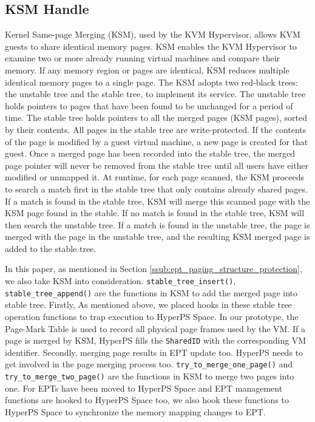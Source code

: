 \subsection{KSM Handle}%
\label{sub:ksm_handle}
Kernel Same-page Merging (KSM), used by the KVM Hypervisor, allows KVM guests to share identical memory pages. 
KSM enables the KVM Hypervisor to examine two or more already running virtual machines and compare their memory. If any memory region or pages are identical, KSM reduces multiple identical memory pages to a single page. 
The KSM adopts two red-black trees: the unstable tree and the stable tree, to implement its service.
The unstable tree holds pointers to pages that have been found to be unchanged for a period of time. 
The stable tree holds pointers to all the merged pages (KSM pages), sorted by their contents. All pages in the stable tree are write-protected. 
If the contents of the page is modified by a guest virtual machine, a new page is created for that guest.
Once a merged page has been recorded into the stable tree, the merged page pointer will never be removed from the stable tree until all users have either modified or unmapped it. 
At runtime, for each page scanned, the KSM proceeds to search a match first in the stable tree that only contains already shared pages. If a match is found in the stable tree, KSM will merge this scanned page with the KSM page found in the stable. 
If no match is found in the stable tree, KSM will then search the unstable tree. If a match is found in the unstable tree, the page is merged with the page in the unstable tree, and the resulting KSM merged page is added to the stable tree. 

In this paper, as mentioned in Section \ref{ssub:ept_paging_structure_protection}, we also take KSM into consideration. 
\verb|stable_tree_insert()|, \verb|stable_tree_append()| are the functions in KSM to add the merged page into stable tree. 
Firstly, As mentioned above, we placed hooks in these stable tree operation functions to trap execution to HyperPS Space. 
In our prototype, the Page-Mark Table is used to record all physical page frames used by the VM. If a page is merged by KSM, HyperPS fills the \verb|SharedID| with the corresponding VM identifier. 
Secondly, merging page results in EPT update too. HyperPS needs to get involved in the page merging process too. 
\verb|try_to_merge_one_page()| and \verb|try_to_merge_two_page()| are the functions in KSM to merge two pages into one. 
For EPTs have been moved to HyperPS Space and EPT management functions are hooked to HyperPS Space too, we also hook these functions to HyperPS Space to synchronize the memory mapping changes to EPT.

